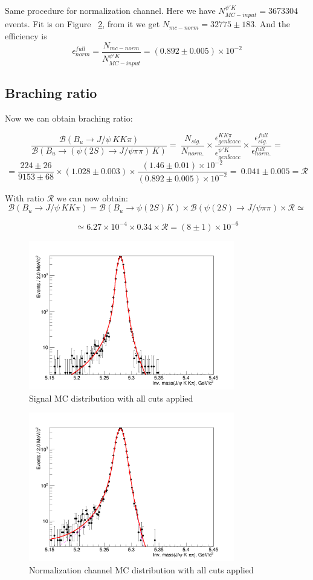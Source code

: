 Same procedure for normalization channel. Here we have $N_{MC-input}^{\psi'K} = 3673304$ events. Fit is on Figure ~\ref{fig:mc-norm}, from it we get $N_{mc-norm} = 32775 \pm 183$. And the efficiency is 
$$\epsilon^{full}_{norm} =  \frac { N_{mc-norm} }{ N_{MC-input}^{\psi'K} } =  (0.892 \pm 0.005) \times 10^{-2}$$


\pagebreak
\subsection{Braching ratio}

Now we can obtain braching ratio:

$$
\frac{\mathcal{B}(B_{u} \to J/\psi \, KK\pi)}{\mathcal{B}(B_{u} \to (\psi(2S) \to J/\psi \pi\pi) \, K)} = \
\frac{ N_{sig.} }{ N_{norm.} } \times \frac{\epsilon_{gen\&acc}^{KK\pi} }{ \epsilon_{gen\&acc}^{\psi'K}} \times \frac{\epsilon_{sig.}^{full}}{\epsilon_{norm.}^{full}} =
$$
$$
= \frac{224 \pm 26}{9153 \pm 68} \times (1.028 \pm 0.003) \times \frac{(1.46 \pm 0.01) \times 10^{-2}}{(0.892 \pm 0.005) \times 10^{-2}} = \
0.041 \pm 0.005 = \mathcal{R}
$$

With ratio $\mathcal{R}$ we can now obtain: 
$$
\mathcal{B}(B_{u} \to J/\psi \, KK\pi) = \mathcal{B}(B_{u} \to \psi(2S) K) \times \mathcal{B}(\psi(2S) \to J/\psi \pi\pi) \times \mathcal{R} \simeq
$$

$$
\simeq 6.27 \times 10^{-4} \times 0.34 \times \mathcal{R} = (8 \pm 1) \times 10^{-6}
$$


\begin{figure}[here]
\centering
\includegraphics[width = 0.8\textwidth]{img/MC-signal.png}
\caption{Signal MC distribution with all cuts applied}
\label{fig:mc-signal}
\end{figure}


\begin{figure}[here]
\centering
\includegraphics[width = 0.8\textwidth]{img/MC-norm.png}
\caption{Normalization channel MC distribution with all cuts applied}
\label{fig:mc-norm}
\end{figure}


